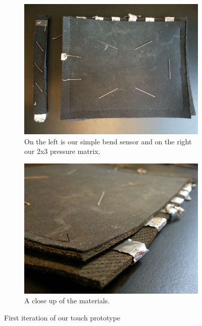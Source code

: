 \begin{figure}[t]
\centering
\begin{subfigure}[t]{.44\textwidth}
  \centering
  \includegraphics[width=\linewidth]{figures/touch/proto1_1}
  \caption{On the left is our simple bend sensor and on the right our 2x3 pressure matrix.}
\end{subfigure}%
\hspace{0.02\textwidth}
\begin{subfigure}[t]{.44\textwidth}
  \centering
  \includegraphics[width=\linewidth]{figures/touch/proto1_2}
  \caption{A close up of the materials.}
\end{subfigure}
\caption{First iteration of our touch prototype}
\label{prototype_1}
\end{figure}

